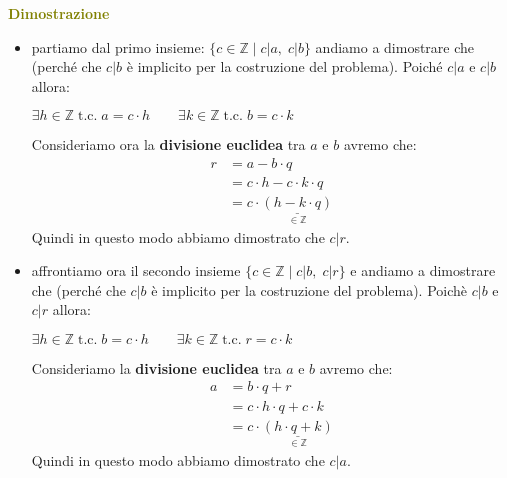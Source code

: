 \begin{boxA}
    \textcolor{olive}{\textbf{Dimostrazione}}
    \begin{itemize}[nosep]
        \item partiamo dal primo insieme: $\{c \in \mathbb{Z} \; \vert \; c | a, \; c | b \}$ andiamo a dimostrare che  (perché che $c|b$ è implicito per la costruzione del problema). Poiché $c|a$ e $c|b$ allora:
        
        {\centering
            $\exists h \in \mathbb{Z} \; \text{t.c.} \; a = c \cdot h \qquad \exists k \in \mathbb{Z} \; \text{t.c.} \; b = c \cdot k$
        \par}

        Consideriamo ora la \textbf{divisione euclidea} tra $a$ e $b$ avremo che:
        \begin{align*}
            r &= a - b \cdot q \\
            &= c \cdot h - c \cdot k \cdot q \\
            & = c \cdot \underset{\in \mathbb{Z}}{\underline{(h - k \cdot q)}}
        \end{align*}
        Quindi in questo modo abbiamo dimostrato che $c|r$.
    \end{itemize}
\end{boxA}

\begin{boxA}
    \begin{itemize}[nosep]
        \item affrontiamo ora il secondo insieme $\{c \in \mathbb{Z} \; | \; c | b, \; c | r \}$ e andiamo a dimostrare che  (perché che $c|b$ è implicito per la costruzione del problema). Poichè $c|b$ e $c|r$ allora:

        {\centering
            $\exists h \in \mathbb{Z} \; \text{t.c.} \; b = c \cdot h \qquad \exists k \in \mathbb{Z} \; \text{t.c.} \; r = c \cdot k$
        \par}

        Consideriamo la \textbf{divisione euclidea} tra $a$ e $b$ avremo che:
        \begin{align*}
            a &= b \cdot q + r \\
            &= c \cdot h \cdot q + c \cdot k \\
            &= c \cdot \underset{\in \mathbb{Z}}{\underline{(h \cdot q + k)}}
        \end{align*} 
        Quindi in questo modo abbiamo dimostrato che $c|a$.
    \end{itemize}
\end{boxA}

